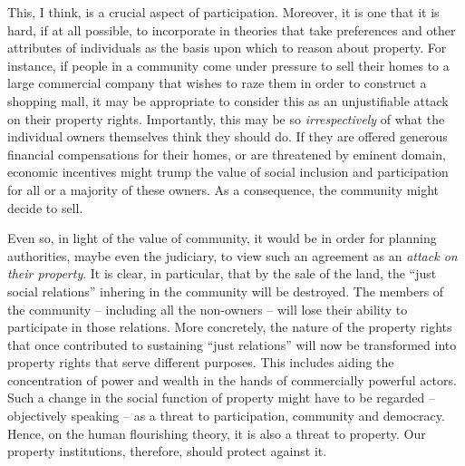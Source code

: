 This, I think, is a crucial aspect of participation. Moreover, it is one that it is hard, if at all possible, to incorporate in theories that take  preferences and other attributes of individuals as the basis upon which to reason about property. For instance, if people in a community come under pressure to sell their homes to a large commercial company that wishes to raze them in order to construct a shopping mall, it may be appropriate to consider this as an unjustifiable attack on their property rights. Importantly, this may be so {\it irrespectively} of what the individual owners themselves think they should do. If they are offered generous financial compensations for their homes, or are threatened by eminent domain, economic incentives might trump the value of social inclusion and participation for all or a majority of these owners. As a consequence, the community might decide to sell.  

Even so, in light of the value of community, it would be in order for planning authorities, maybe even the judiciary, to view such an  agreement as an {\it attack on their property}. It is clear, in particular, that by the sale of the land, the ``just social relations'' inhering in the community will be destroyed. The members of the community -- including all the non-owners -- will lose their ability to participate in those relations. More concretely, the nature of the property rights that once contributed to sustaining ``just relations'' will now be transformed into property rights that serve different purposes. This includes aiding the concentration of power and wealth in the hands of commercially powerful actors. Such a change in the social function of property might have to be regarded -- objectively speaking -- as a threat to participation, community and democracy. Hence, on the human flourishing theory, it is also a threat to property. Our property institutions, therefore, should protect against it.


